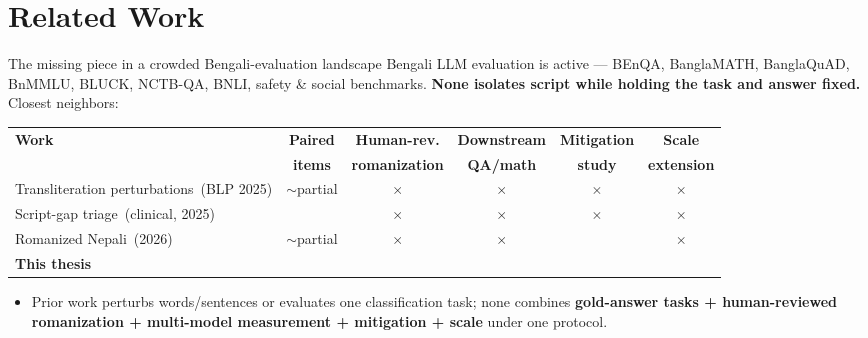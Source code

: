 \documentclass[aspectratio=169,10pt]{beamer}
\newcommand{\cmark}{\textcolor{cGood}{\checkmark}}
\newcommand{\xmark}{\textcolor{cBad}{$\times$}}
\newcommand{\pmark}{\textcolor{cWarn}{$\sim$}}
\begin{document}
\section{Related Work}

\begin{frame}{The missing piece in a crowded Bengali-evaluation landscape}
  \vspace{2pt}
  Bengali LLM evaluation is active --- BEnQA, BanglaMATH, BanglaQuAD, BnMMLU, BLUCK,
  NCTB-QA, BNLI, safety \& social benchmarks. \textbf{None isolates script while
  holding the task and answer fixed.} Closest neighbors:
  \vspace{6pt}
  \begin{center}
  {\fontsize{8.5}{12}\selectfont
  \renewcommand{\arraystretch}{1.25}
  \begin{tabular}{@{}lccccc@{}}
    \toprule
    \textbf{Work} & \textbf{Paired} & \textbf{Human-rev.} & \textbf{Downstream} & \textbf{Mitigation} & \textbf{Scale}\\
                  & \textbf{items}  & \textbf{romanization} & \textbf{QA/math} & \textbf{study} & \textbf{extension}\\
    \midrule
    Transliteration perturbations \,{\scriptsize(BLP 2025)} & \pmark\;partial & \xmark & \xmark & \xmark & \xmark\\
    Script-gap triage \,{\scriptsize(clinical, 2025)}       & \cmark          & \xmark & \xmark & \xmark & \xmark\\
    Romanized Nepali \,{\scriptsize(2026)}                  & \pmark\;partial & \xmark & \xmark & \cmark & \xmark\\
    \rowcolor{cBangla!12}
    \textbf{This thesis} & \cmark & \cmark & \cmark & \cmark & \cmark\\
    \bottomrule
  \end{tabular}\par}
  \end{center}
  \vspace{6pt}
  \begin{itemize}
    \item Prior work perturbs words/sentences or evaluates one classification task;
          none combines \textbf{gold-answer tasks + human-reviewed romanization +
          multi-model measurement + mitigation + scale} under one protocol.
  \end{itemize}
\end{frame}
\end{document}
